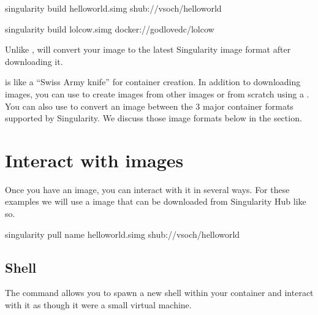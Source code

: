 \documentclass[letterpaper,10pt,english]{sphinxmanual}
\begin{document}
%
\begin{sphinxVerbatim}[commandchars=\\\{\}]
\PYGZdl{} singularity build hello\PYGZhy{}world.simg shub://vsoch/hello\PYGZhy{}world

\PYGZdl{} singularity build lolcow.simg docker://godlovedc/lolcow
\end{sphinxVerbatim}

Unlike ,  will convert your image to the latest Singularity image format
after downloading it.

 is like a “Swiss Army knife” for container creation. In addition to
downloading images, you can use  to create images from other images or
from scratch using a . You can also use  to convert an image between the
3 major container formats supported by Singularity. We discuss those
image formats below in the {\hyperref[\detokenize{quick_start:build-images-from-scratch}]{}} section.


\section{Interact with images}
\label{\detokenize{quick_start:interact-with-images}}
Once you have an image, you can interact with it in several ways. For
these examples we will use a  image that can be downloaded from
Singularity Hub like so.

%
\begin{sphinxVerbatim}[commandchars=\\\{\}]
\PYGZdl{} singularity pull \PYGZhy{}\PYGZhy{}name hello\PYGZhy{}world.simg shub://vsoch/hello\PYGZhy{}world
\end{sphinxVerbatim}


\subsection{Shell}
\label{\detokenize{quick_start:shell}}
The  command allows you to spawn a new shell within your container and
interact with it as though it were a small virtual machine.
\end{document}
